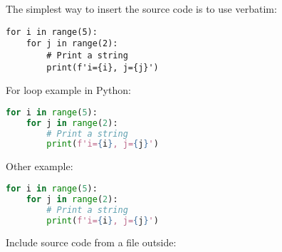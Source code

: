 \documentclass[11pt]{article}
\begin{document}
The simplest way to insert the source code is to use verbatim:

\begin{verbatim}
for i in range(5):
    for j in range(2):
        # Print a string
        print(f'i={i}, j={j}')
\end{verbatim}



\vspace{10mm} For loop example in Python:

\begin{lstlisting}[language=Python]
for i in range(5):
    for j in range(2):
        # Print a string
        print(f'i={i}, j={j}')
\end{lstlisting}



\vspace{10mm} Other example:

\begin{lstlisting}[language=python, style=mystyle]
for i in range(5):
    for j in range(2):
        # Print a string
        print(f'i={i}, j={j}')
\end{lstlisting}


\newpage\vspace{10mm}
Include source code from a file outside:


\end{document}
